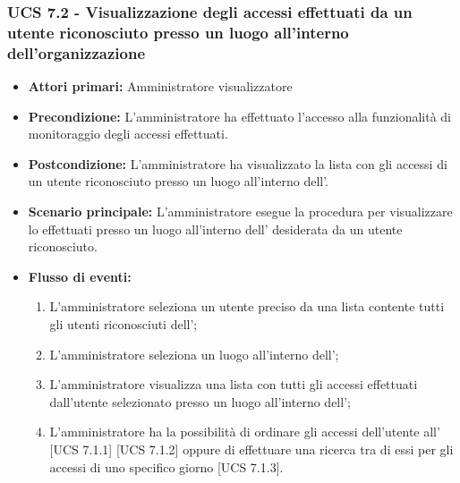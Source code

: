 \subsubsection{UCS 7.2 - Visualizzazione degli accessi effettuati da un utente riconosciuto presso un luogo all'interno dell'organizzazione}
\begin{itemize}
	\item \textbf{Attori primari:} Amministratore visualizzatore
	\item \textbf{Precondizione:} L'amministratore ha effettuato l'accesso alla funzionalità di monitoraggio degli accessi effettuati.
	\item \textbf{Postcondizione:} L'amministratore ha visualizzato la lista con gli accessi di un utente riconosciuto presso un luogo all'interno dell'.
	\item \textbf{Scenario principale:} L'amministratore esegue la procedura per visualizzare lo  effettuati presso un luogo all'interno dell' desiderata da un utente riconosciuto.
	\item \textbf{Flusso di eventi:}
	\begin{enumerate}
	\item L'amministratore seleziona un utente preciso da una lista contente tutti gli utenti riconosciuti dell';
	\item L'amministratore seleziona un luogo all'interno dell';
	\item L'amministratore visualizza una lista con tutti gli accessi effettuati dall'utente selezionato presso un luogo all'interno dell';
	\item L'amministratore ha la possibilità di ordinare gli accessi dell'utente all' [UCS 7.1.1] [UCS 7.1.2] oppure di effettuare una ricerca tra di essi per gli accessi di uno specifico giorno [UCS 7.1.3].
	\end{enumerate}
\end{itemize}




